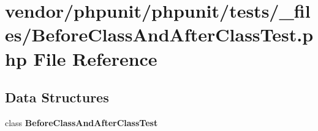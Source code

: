 \section{vendor/phpunit/phpunit/tests/\+\_\+files/\+Before\+Class\+And\+After\+Class\+Test.php File Reference}
\label{_before_class_and_after_class_test_8php}
\subsection*{Data Structures}
\begin{DoxyCompactItemize}
\item 
class {\bf Before\+Class\+And\+After\+Class\+Test}
\end{DoxyCompactItemize}
